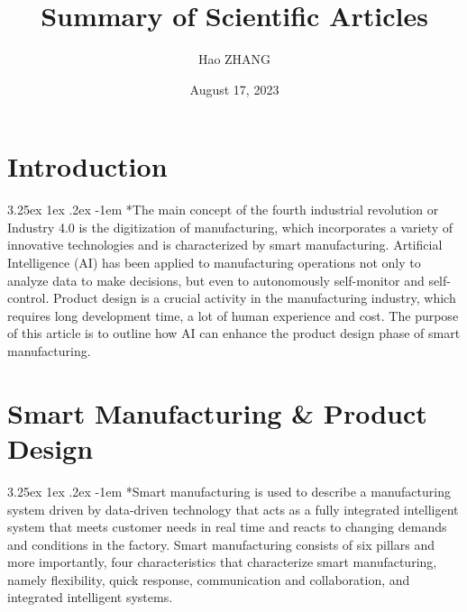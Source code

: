 \documentclass{article}
\title{Summary of Scientific Articles}
\author{Hao ZHANG}
\date{August 17, 2023}
\makeatletter
\renewcommand\paragraph{\@startsection{paragraph}{4}{\z@}%
	{3.25ex \@plus1ex \@minus.2ex}%
	{-1em}%
	{\normalfont\normalsize}}
\makeatother
\begin{document}
	
	\maketitle
	
	
	\section*{Introduction}
	
	\paragraph*{The main concept of the fourth industrial revolution or Industry 4.0 is the digitization of manufacturing, which incorporates a variety of innovative technologies and is characterized by smart manufacturing. Artificial Intelligence (AI) has been applied to manufacturing operations not only to analyze data to make decisions, but even to autonomously self-monitor and self-control. Product design is a crucial activity in the manufacturing industry, which requires long development time, a lot of human experience and cost. The purpose of this article is to outline how AI can enhance the product design phase of smart manufacturing.}
	
	\section*{Smart Manufacturing \& Product Design}
	
	\paragraph*{Smart manufacturing is used to describe a manufacturing system driven by data-driven technology that acts as a fully integrated intelligent system that meets customer needs in real time and reacts to changing demands and conditions in the factory. Smart manufacturing consists of six pillars and more importantly, four characteristics that characterize smart manufacturing, namely flexibility, quick response, communication and collaboration, and integrated intelligent systems.}
	
\end{document}
